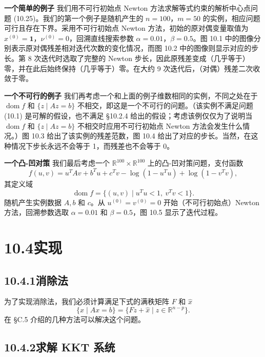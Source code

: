 \documentclass[UTF8, 12pt, fontset=fandol, oneside]{ctexart}
\begin{document}
\noindent\textbf{一个简单的例子}\quad
我们用不可行初始点 Newton 方法求解等式约束的解析中心点问题 (10.25)。我们的第一个例子是随机产生的 $n=100$，$m=50$ 的实例，相应问题可行且存在下界。采用不可行初始点 Newton 方法，初始的原对偶变量取值为 $x^{(0)}=\mathbf{1}$，$\nu^{(0)}=0$，回溯直线搜索参数 $\alpha=0.01$，$\beta=0.5$。图 10.1 中的图像分别表示原对偶残差相对迭代次数的变化情况，而图 10.2 中的图像则显示对应的步长。第 8 次迭代时选取了完整的 Newton 步长，因此原残差变成（几乎等于）零，并在此后始终保持（几乎等于）零。在大约 9 次迭代后，（对偶）残差二次收敛于零。

\noindent\textbf{一个不可行的例子}\quad
我们再考虑一个和上面的例子维数相同的实例，不同之处在于 $\operatorname{dom} f$ 和 $\{z\mid Az=b\}$ 不相交，即这是一个不可行的问题。（该实例不满足问题 (10.1) 是可解的假设，也不满足 \S10.2.4 给出的假设；考虑该例仅仅为了说明当 $\operatorname{dom} f$ 和 $\{z\mid Az=b\}$ 不相交时应用不可行初始点 Newton 方法会发生什么情况。）图 10.3 给出了该实例的残差范数，图 10.4 给出了对应的步长。当然，在这种情况下步长永远不会等于 1，而残差也不会等于 0。

\noindent\textbf{一个凸-凹对策}\quad
我们最后考虑一个 $\mathbb{R}^{100}\times\mathbb{R}^{100}$ 上的凸-凹对策问题，支付函数
\begin{equation}
f(u,v)=u^TAv+b^Tu+c^Tv-\log(1-u^Tu)+\log(1-v^Tv),
\tag{10.32}
\end{equation}
其定义域
\[
\operatorname{dom} f=\{(u,v)\mid u^Tu<1,\ v^Tv<1\}.
\]
随机产生实例数据 $A,b$ 和 $c$。从 $u^{(0)}=v^{(0)}=0$ 开始（不可行初始点）Newton 方法，回溯参数选取 $\alpha=0.01$ 和 $\beta=0.5$，图 10.5 显示了迭代过程。

\section*{10.4\quad 实现}

\subsection*{10.4.1\quad 消除法}

为了实现消除法，我们必须计算满足下式的满秩矩阵 $F$ 和 $\hat{x}$
\[
\{x\mid Ax=b\}=\{Fz+\hat{x}\mid z\in\mathbb{R}^{n-p}\}.
\]
在 \S C.5 介绍的几种方法可以解决这个问题。

\subsection*{10.4.2\quad 求解 KKT 系统}
\end{document}
